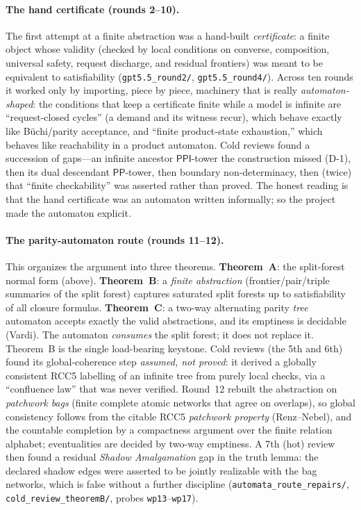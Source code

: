 \documentclass[11pt]{article}
\newcommand{\PP}{\mathsf{PP}}
\newcommand{\PPI}{\mathsf{PPI}}
\theoremstyle{plain}
\theoremstyle{definition}
\begin{document}
\paragraph{The hand certificate (rounds 2--10).} The first attempt at a
finite abstraction was a hand-built \emph{certificate}: a finite object
whose validity (checked by local conditions on converse, composition,
universal safety, request discharge, and residual frontiers) was meant to
be equivalent to satisfiability
(\texttt{gpt5.5\_round2/}, \texttt{gpt5.5\_round4/}). Across ten rounds it
worked only by importing, piece by piece, machinery that is really
\emph{automaton-shaped}: the conditions that keep a certificate finite
while a model is infinite are ``request-closed cycles'' (a demand and its
witness recur), which behave exactly like B\"uchi/parity acceptance, and
``finite product-state exhaustion,'' which behaves like reachability in a
product automaton. Cold reviews found a succession of gaps---an
infinite ancestor $\PPI$-tower the construction missed (D-1), then its
dual descendant $\PP$-tower, then boundary non-determinacy, then (twice)
that ``finite checkability'' was asserted rather than proved. The honest
reading is that the hand certificate was an automaton written informally;
so the project made the automaton explicit.

\paragraph{The parity-automaton route (rounds 11--12).} This organizes the
argument into three theorems. \textbf{Theorem~A}: the split-forest normal
form (above). \textbf{Theorem~B}: a \emph{finite abstraction}
(frontier/pair/triple summaries of the split forest) captures saturated
split forests up to satisfiability of all closure formulas.
\textbf{Theorem~C}: a two-way alternating parity \emph{tree} automaton
accepts exactly the valid abstractions, and its emptiness is decidable
(Vardi). The automaton \emph{consumes} the split forest; it does not
replace it. Theorem~B is the single load-bearing keystone. Cold reviews
(the 5th and 6th) found its global-coherence step \emph{assumed, not
proved}: it derived a globally consistent RCC5 labelling of an infinite
tree from purely local checks, via a ``confluence law'' that was never
verified. Round~12 rebuilt the abstraction on \emph{patchwork bags}
(finite complete atomic networks that agree on overlaps), so global
consistency follows from the citable RCC5 \emph{patchwork property}
(Renz--Nebel), and the countable completion by a compactness argument over
the finite relation alphabet; eventualities are decided by two-way
emptiness. A 7th (hot) review then found a residual \emph{Shadow
Amalgamation} gap in the truth lemma: the declared shadow edges were
asserted to be jointly realizable with the bag networks, which is false
without a further discipline (\texttt{automata\_route\_repairs/},
\texttt{cold\_review\_theoremB/}, probes \texttt{wp13}--\texttt{wp17}).
\end{document}
